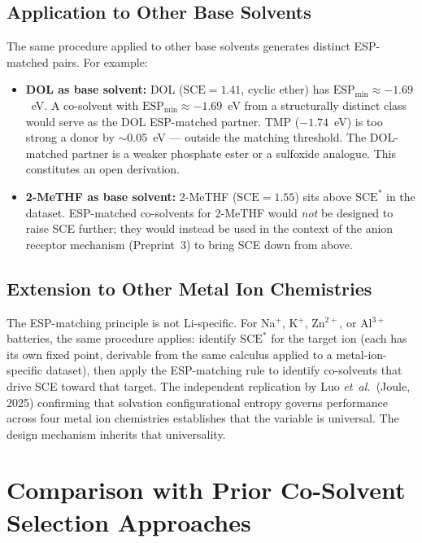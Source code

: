 \documentclass[11pt]{article}
\theoremstyle{plain}
\theoremstyle{definition}
\theoremstyle{remark}
\begin{document}
\subsection{Application to Other Base Solvents}

The same procedure applied to other base solvents generates distinct
ESP-matched pairs.  For example:
\begin{itemize}[leftmargin=2em]
  \item \textbf{DOL as base solvent:} DOL
        ($\mathrm{SCE} = 1.41$, cyclic ether) has
        $\mathrm{ESP}_{\min} \approx -1.69$~eV.  A co-solvent with
        $\mathrm{ESP}_{\min} \approx -1.69$~eV from a structurally
        distinct class would serve as the DOL ESP-matched partner.
        TMP ($-1.74$~eV) is too strong a donor by $\sim 0.05$~eV ---
        outside the matching threshold.  The DOL-matched partner is
        a weaker phosphate ester or a sulfoxide analogue.  This
        constitutes an open derivation.
  \item \textbf{2-MeTHF as base solvent:} 2-MeTHF ($\mathrm{SCE} = 1.55$)
        sits above $\mathrm{SCE}^{*}$ in the dataset.  ESP-matched
        co-solvents for 2-MeTHF would \emph{not} be designed to raise
        SCE further; they would instead be used in the context of the
        anion receptor mechanism (Preprint~3) to bring SCE down from
        above.
\end{itemize}

\subsection{Extension to Other Metal Ion Chemistries}

The ESP-matching principle is not Li-specific.  For Na$^+$, K$^+$, Zn$^{2+}$,
or Al$^{3+}$ batteries, the same procedure applies: identify
$\mathrm{SCE}^{*}$ for the target ion (each has its own fixed point,
derivable from the same calculus applied to a metal-ion-specific dataset),
then apply the ESP-matching rule to identify co-solvents that drive SCE
toward that target.  The independent replication by Luo \textit{et~al.}\
(Joule, 2025) \cite{Luo2025} confirming that solvation configurational
entropy governs performance across four metal ion chemistries establishes
that the variable is universal.  The design mechanism inherits that
universality.

\section{Comparison with Prior Co-Solvent Selection Approaches}
\label{sec:comparison}
\end{document}

